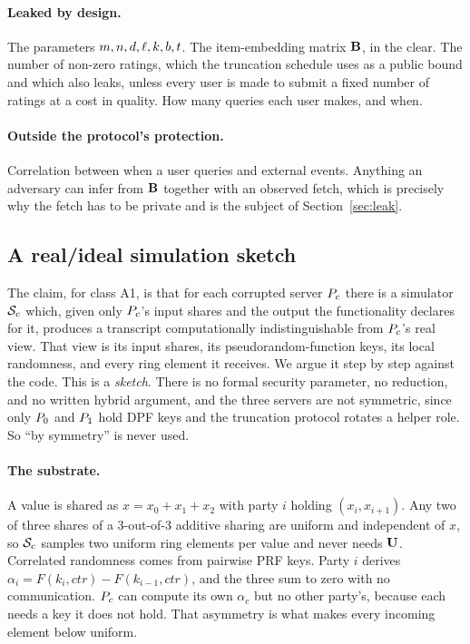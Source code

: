\paragraph{Leaked by design.} The parameters $m, n, d, \ell,
k, b, t$. The item-embedding matrix $\mathbf{B}$, in the clear.
The number of non-zero ratings, which the truncation schedule uses as a public
bound and which \nudgeplain{} also leaks, unless every user is made to submit a
fixed number of ratings at a cost in quality. How many queries each user makes,
and when.

\paragraph{Outside the protocol's protection.} Correlation between when a user
queries and external events. Anything an adversary can infer from $\mathbf{B}$
together with an observed fetch, which is precisely why the fetch has to be
private and is the subject of Section~\ref{sec:leak}.

\subsection{A real/ideal simulation sketch}
\label{sec:threat:sketch}

The claim, for class A1, is that for each corrupted server $P_{c}$ there is
a simulator $\mathcal{S}_c$ which, given only $P_{c}$'s input shares and the output
the functionality declares for it, produces a transcript computationally
indistinguishable from $P_{c}$'s real view. That view is its input shares,
its pseudorandom-function keys, its local randomness, and every ring element it
receives. We argue it step by step against the code. This is a \emph{sketch}.
There is no formal security parameter, no reduction, and no written hybrid
argument, and the three servers are not symmetric, since only $P_{0}$ and
$P_{1}$ hold DPF keys and the truncation protocol rotates a helper role. So
``by symmetry'' is never used.

\paragraph{The substrate.} A value is shared as $x = x_0 + x_1 + x_2$ with party
$i$ holding $(x_i, x_{i+1})$. Any two of three shares of a 3-out-of-3 additive
sharing are uniform and independent of $x$, so $\mathcal{S}_c$ samples two uniform ring
elements per value and never needs $\mathbf{U}$. Correlated randomness comes from
pairwise PRF keys. Party $i$ derives $\alpha_i = F(k_i, \mathit{ctr}) - F(k_{i-1},
\mathit{ctr})$, and the three sum to zero with no communication. $P_{c}$ can
compute its own $\alpha_c$ but no other party's, because each needs a key it
does not hold. That asymmetry is what makes every incoming element below
uniform.

